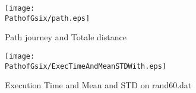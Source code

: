 \begin{figure}[H]
	\begin{minipage}[t]{0.45\linewidth}
	\centering
	\texttt{[image: \\PathofGsix/path.eps]}
	\caption{Path journey and Totale distance}\label{fig:PathofGsix:path}
	
	\end{minipage}\hfill
	\begin{minipage}[t]{0.45\linewidth}
	\centering
	\texttt{[image: \\PathofGsix/ExecTimeAndMeanSTDWith.eps]}
	\caption{Execution Time and Mean and STD on rand60.dat}
	\label{fig:PathofGsix:AS_1_5AS_ExecTimeAndMeanSTDWith_execVariation}
	\end{minipage}
\end{figure}